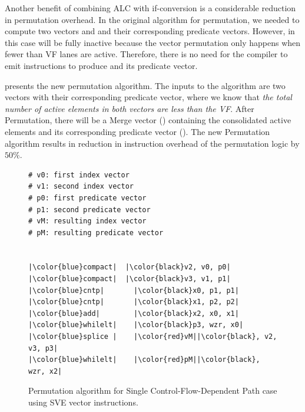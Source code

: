 Another benefit of combining ALC with if-conversion is a considerable reduction in permutation overhead. In the original algorithm for permutation, we needed to compute two vectors \vM and \vR and their corresponding predicate vectors. However, in this case \vR will be fully inactive because the vector permutation only happens when fewer than VF lanes are active. 
Therefore, there is no need for the compiler to emit instructions to produce \vR and its predicate vector.

 presents the new permutation algorithm. The inputs to the algorithm are two vectors with their corresponding predicate vector, where we know that \emph{the total number of active elements in both vectors are less than the VF}. After Permutation, there will be a Merge vector () containing the consolidated active elements and its corresponding predicate vector ().
The new Permutation algorithm results in reduction in instruction overhead of the permutation logic by $50\%$. 

\begin{figure}[h]
\begin{lstlisting}[escapechar=|,language=PretendAsm, basicstyle=\fontsize{12}{14}\selectfont, style=code_snippet_style]
# v0: first index vector
# v1: second index vector
# p0: first predicate vector
# p1: second predicate vector
# vM: resulting index vector
# pM: resulting predicate vector


|\color{blue}compact|  |\color{black}v2, v0, p0| 
|\color{blue}compact|  |\color{black}v3, v1, p1|
|\color{blue}cntp|       |\color{black}x0, p1, p1|
|\color{blue}cntp|       |\color{black}x1, p2, p2|
|\color{blue}add|        |\color{black}x2, x0, x1|
|\color{blue}whilelt|    |\color{black}p3, wzr, x0|
|\color{blue}splice |    |\color{red}vM||\color{black}, v2, v3, p3|
|\color{blue}whilelt|    |\color{red}pM||\color{black}, wzr, x2|
\end{lstlisting}
\caption{Permutation algorithm for Single Control-Flow-Dependent Path case using SVE vector instructions.}
\label{fig:new-permutation}
\end{figure}




